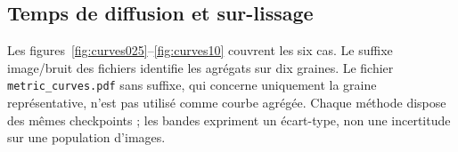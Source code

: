 \begin{table}[htbp]
 \centering
 \caption{Toutes les méthodes à budget commun pour
 \texttt{geometric\_shapes}, $\sigma=0{,}10$, $n=20$, $t=4$ ;
 ligne bruitée de référence à $n=0$. Moyennes $\pm$ écarts-types
 échantillonnaux sur dix graines. $K=0{,}025$ est conservé exactement
 comme paramètre, sans arrondi en $0{,}03$.}
 \label{tab:common-n20}
 
\end{table}

\subsection{Temps de diffusion et sur-lissage}

Les figures~\ref{fig:curves025}--\ref{fig:curves10} couvrent les six cas.
Le suffixe image/bruit des fichiers identifie les agrégats sur dix
graines. Le fichier \texttt{metric\_curves.pdf} sans suffixe, qui concerne
uniquement la graine représentative, n'est pas utilisé comme courbe
agrégée. Chaque méthode dispose des mêmes checkpoints ; les bandes
expriment un écart-type, non une incertitude sur une population d'images.

